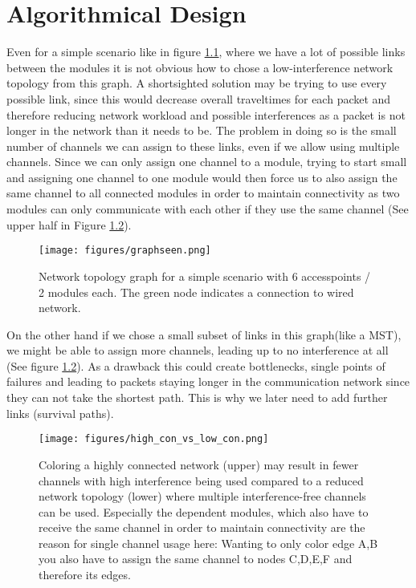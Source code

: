 \chapter{Algorithmical Design}
  Even for a simple scenario like in figure \ref{fig:graphseen}, where we have a lot of possible links between the modules it is not obvious how to
  chose a low-interference network topology from this graph.
  A shortsighted solution may be trying to use every possible link, since this would decrease overall traveltimes for each packet and therefore
  reducing network workload and possible interferences as a packet is not longer in the network than it needs to be. 
  The problem in doing so is the small number of channels we can assign to these links, even if we allow using multiple channels.
  Since we can only assign one channel to a module, trying to start small and assigning one channel to one module would then force us to also 
  assign the same channel to all connected modules in order to maintain connectivity as two modules can only communicate with each other if they use the same channel
  (See upper half in Figure \ref{fig:high_con_vs_low_con}). 
  
  \begin{figure}[h!]
    \centering
    \texttt{[image: figures/graphseen.png]}
    \caption{Network topology graph for a simple scenario with 6 accesspoints / 2 modules each. The green node indicates a connection to wired network.}
    \label{fig:graphseen}
  \end{figure}

  On the other hand if we chose a small subset of links in this graph(like a \ac{MST}), we might be able to 
  assign more channels, leading up to no interference at all (See figure \ref{fig:high_con_vs_low_con}).
  As a drawback this could create bottlenecks, single points of failures and leading to packets staying longer in the 
  communication network since they can not take the shortest path. This is why we later need to add further links (survival paths).

  \begin{figure}[h!]
    \centering
    \texttt{[image: figures/high\_con\_vs\_low\_con.png]}
    \caption{Coloring a highly connected network (upper) may result in fewer channels with high interference being used compared to 
      a reduced network topology (lower) where multiple interference-free channels can be used. Especially the dependent modules, which also have to receive the same channel
      in order to maintain connectivity are the reason for single channel usage here: Wanting to only color edge A,B you also have to assign the same channel to nodes C,D,E,F
      and therefore its edges.}
    \label{fig:high_con_vs_low_con}
  \end{figure}
  
